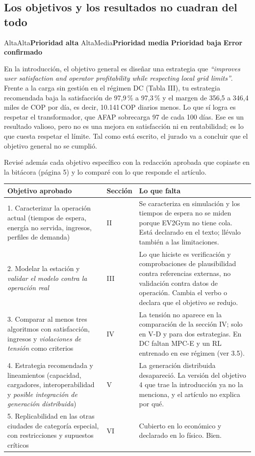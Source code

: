 \documentclass[11pt]{article}
\newcommand{\prioridad}[1]{%
  \def\tmpA{Alta}\def\tmpM{Media}\def\tmp{#1}%
  \ifx\tmp\tmpA\colorbox{rojoerror}{\color{white}\small\bfseries Prioridad alta}%
  \else\ifx\tmp\tmpM\colorbox{naranjatarea}{\color{white}\small\bfseries Prioridad media}%
  \else\colorbox{azulidea}{\color{white}\small\bfseries Prioridad baja}\fi\fi}
\newcommand{\confirmado}{\colorbox{rojoerror!15}{\small\bfseries\color{rojoerror} Error confirmado}}
\begin{document}
\subsection{Los objetivos y los resultados no cuadran del todo}
\prioridad{Alta} \confirmado

\begin{error}
En la introducción, el objetivo general es diseñar una estrategia que \foreignlanguage{english}{\emph{``improves user satisfaction and operator profitability while respecting local grid limits''}}. Frente a la carga sin gestión en el régimen DC (Tabla III), tu estrategia recomendada baja la satisfacción de 97,9\,\% a 97,3\,\% y el margen de 356,5 a 346,4 miles de COP por día, es decir, 10.141\,COP diarios menos. Lo que sí logra es respetar el transformador, que AFAP sobrecarga 97 de cada 100 días. Ese es un resultado valioso, pero no es una mejora en satisfacción ni en rentabilidad; es lo que cuesta respetar el límite. Tal como está escrito, el jurado va a concluir que el objetivo general no se cumplió.
\end{error}

Revisé además cada objetivo específico con la redacción aprobada que copiaste en la bitácora (página 5) y lo comparé con lo que responde el artículo.

\begin{center}
\small
\begin{tabularx}{\textwidth}{@{}p{4.3cm}lX@{}}
\toprule
Objetivo aprobado & Sección & Lo que falta \\
\midrule
1. Caracterizar la operación actual (tiempos de espera, energía no servida, ingresos, perfiles de demanda) & II & Se caracteriza en simulación y los tiempos de espera no se miden porque EV2Gym no tiene cola. Está declarado en el texto; llévalo también a las limitaciones. \\
2. Modelar la estación y \emph{validar el modelo contra la operación real} & III & Lo que hiciste es verificación y comprobaciones de plausibilidad contra referencias externas, no validación contra datos de operación. Cambia el verbo o declara que el objetivo se redujo. \\
3. Comparar al menos tres algoritmos con satisfacción, ingresos y \emph{violaciones de tensión} como criterios & IV & La tensión no aparece en la comparación de la sección IV; solo en V-D y para dos estrategias. En DC faltan MPC-E y un RL entrenado en ese régimen (ver 3.5). \\
4. Estrategia recomendada y lineamientos (capacidad, cargadores, interoperabilidad y \emph{posible integración de generación distribuida}) & V & La generación distribuida desapareció. La versión del objetivo 4 que trae la introducción ya no la menciona, y el artículo no explica por qué. \\
5. Replicabilidad en las otras ciudades de categoría especial, con restricciones y supuestos críticos & VI & Cubierto en lo económico y declarado en lo físico. Bien. \\
\bottomrule
\end{tabularx}
\end{center}
\end{document}
